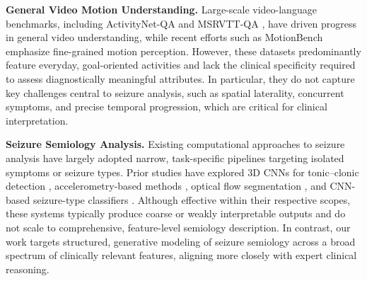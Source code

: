 \documentclass{article}
\theoremstyle{plain}
\theoremstyle{definition}
\theoremstyle{remark}
\begin{document}

\textbf{General Video Motion Understanding.} Large-scale video-language benchmarks, including ActivityNet-QA \cite{Yu2019ActivityNetQA} and MSRVTT-QA \cite{Jun2016MSRVTT}, have driven progress in general video understanding, while recent efforts such as MotionBench \cite{Hong2025MotionBench} emphasize fine-grained motion perception. However, these datasets predominantly feature everyday, goal-oriented activities and lack the clinical specificity required to assess diagnostically meaningful attributes. In particular, they do not capture key challenges central to seizure analysis, such as spatial laterality, concurrent symptoms, and precise temporal progression, which are critical for clinical interpretation.

\textbf{Seizure Semiology Analysis.} Existing computational approaches to seizure analysis have largely adopted narrow, task-specific pipelines targeting isolated symptoms or seizure types. Prior studies have explored 3D CNNs for tonic–clonic detection \cite{boyne2025videotonic}, accelerometry-based methods \cite{poh2012eda_accel_seizure}, optical flow segmentation \cite{kalitzin2012opticalflow_clonic_video}, and CNN-based seizure-type classifiers \cite{mehta2023privacy}. Although effective within their respective scopes, these systems typically produce coarse or weakly interpretable outputs and do not scale to comprehensive, feature-level semiology description. In contrast, our work targets structured, generative modeling of seizure semiology across a broad spectrum of clinically relevant features, aligning more closely with expert clinical reasoning.
\end{document}
